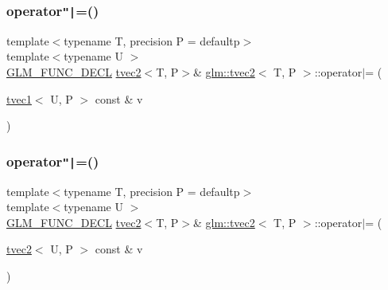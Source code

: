 \mbox{\label{structglm_1_1tvec2_a4cb8e942400c0ea18beb292a50c49958}} 
\subsubsection{\texorpdfstring{operator\texttt{"|}=()}{operator|=()}\hspace{0.1cm}{\footnotesize\ttfamily [2/6]}}
{\footnotesize\ttfamily template$<$typename T, precision P = defaultp$>$ \\
template$<$typename U $>$ \\
\mbox{\hyperlink{setup_8hpp_ab2d052de21a70539923e9bcbf6e83a51}{G\+L\+M\+\_\+\+F\+U\+N\+C\+\_\+\+D\+E\+CL}} \mbox{\hyperlink{structglm_1_1tvec2}{tvec2}}$<$T, P$>$\& \mbox{\hyperlink{structglm_1_1tvec2}{glm\+::tvec2}}$<$ T, P $>$\+::operator$\vert$= (\begin{DoxyParamCaption}\item[{\mbox{\hyperlink{structglm_1_1tvec1}{tvec1}}$<$ U, P $>$ const \&}]{v }\end{DoxyParamCaption})}

\mbox{\label{structglm_1_1tvec2_a2bb8b0876df3f551acf4dae3134e0d2e}} 
\subsubsection{\texorpdfstring{operator\texttt{"|}=()}{operator|=()}\hspace{0.1cm}{\footnotesize\ttfamily [3/6]}}
{\footnotesize\ttfamily template$<$typename T, precision P = defaultp$>$ \\
template$<$typename U $>$ \\
\mbox{\hyperlink{setup_8hpp_ab2d052de21a70539923e9bcbf6e83a51}{G\+L\+M\+\_\+\+F\+U\+N\+C\+\_\+\+D\+E\+CL}} \mbox{\hyperlink{structglm_1_1tvec2}{tvec2}}$<$T, P$>$\& \mbox{\hyperlink{structglm_1_1tvec2}{glm\+::tvec2}}$<$ T, P $>$\+::operator$\vert$= (\begin{DoxyParamCaption}\item[{\mbox{\hyperlink{structglm_1_1tvec2}{tvec2}}$<$ U, P $>$ const \&}]{v }\end{DoxyParamCaption})}

